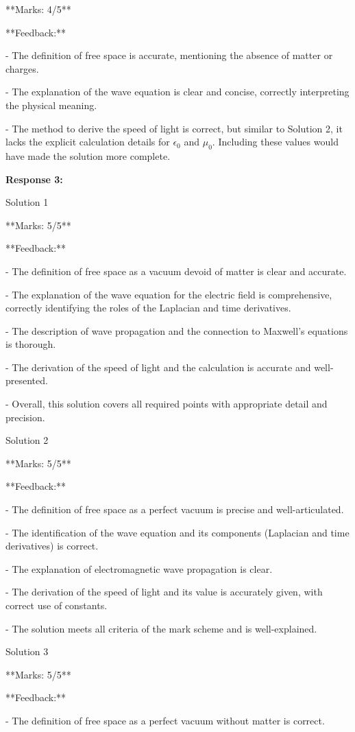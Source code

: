 \documentclass[a4paper,11pt]{article}
\begin{document}
**Marks: 4/5**

**Feedback:**

- The definition of free space is accurate, mentioning the absence of matter or charges.

- The explanation of the wave equation is clear and concise, correctly interpreting the physical meaning.

- The method to derive the speed of light is correct, but similar to Solution 2, it lacks the explicit calculation details for \(\epsilon_{0}\) and \(\mu_{0}\). Including these values would have made the solution more complete.

\bigskip    
\textbf{Response 3:}

Solution 1

**Marks: 5/5**

**Feedback:**

- The definition of free space as a vacuum devoid of matter is clear and accurate.

- The explanation of the wave equation for the electric field is comprehensive, correctly identifying the roles of the Laplacian and time derivatives.

- The description of wave propagation and the connection to Maxwell's equations is thorough.

- The derivation of the speed of light and the calculation is accurate and well-presented.

- Overall, this solution covers all required points with appropriate detail and precision.

Solution 2

**Marks: 5/5**

**Feedback:**

- The definition of free space as a perfect vacuum is precise and well-articulated.

- The identification of the wave equation and its components (Laplacian and time derivatives) is correct.

- The explanation of electromagnetic wave propagation is clear.

- The derivation of the speed of light and its value is accurately given, with correct use of constants.

- The solution meets all criteria of the mark scheme and is well-explained.

Solution 3

**Marks: 5/5**

**Feedback:**

- The definition of free space as a perfect vacuum without matter is correct.
\end{document}
